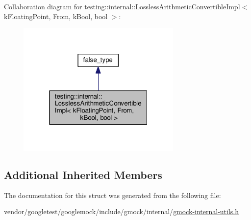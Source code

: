 Collaboration diagram for testing\+:\+:internal\+:\+:Lossless\+Arithmetic\+Convertible\+Impl$<$ k\+Floating\+Point, From, k\+Bool, bool $>$\+:\nopagebreak
\begin{figure}[H]
\begin{center}
\leavevmode
\includegraphics[width=229pt]{structtesting_1_1internal_1_1LosslessArithmeticConvertibleImpl_3_01kFloatingPoint_00_01From_00_05b3aa5fa4ae80b732d53037e1285f2e3}
\end{center}
\end{figure}
\subsection*{Additional Inherited Members}


The documentation for this struct was generated from the following file\+:\begin{DoxyCompactItemize}
\item 
vendor/googletest/googlemock/include/gmock/internal/\hyperlink{gmock-internal-utils_8h}{gmock-\/internal-\/utils.\+h}\end{DoxyCompactItemize}
